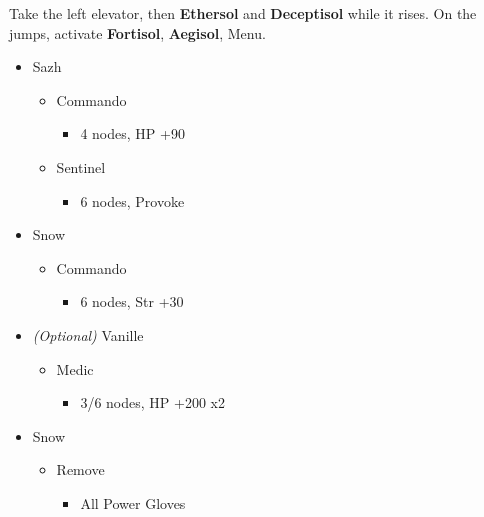\begin{multicols}{2}
	Take the left elevator, then \textbf{Ethersol} and \textbf{Deceptisol} while it rises. On the jumps, activate \textbf{Fortisol}, \textbf{Aegisol}, Menu.
	\begin{menu}
		\begin{itemize}
			\crystarium
			\begin{itemize}
				\item Sazh
				      \begin{itemize}
					      \item Commando
					            \begin{itemize}
						            \item 4 nodes, HP +90
					            \end{itemize}
					      \item Sentinel
					            \begin{itemize}
						            \item 6 nodes, Provoke
					            \end{itemize}
				      \end{itemize}
				\item Snow
				      \begin{itemize}
					      \item Commando
					            \begin{itemize}
						            \item 6 nodes, Str +30
					            \end{itemize}
				      \end{itemize}
				\item \textit{(Optional)} Vanille
				      \begin{itemize}
					      \item Medic
					            \begin{itemize}
						            \item 3/6 nodes, HP +200 x2
					            \end{itemize}
				      \end{itemize}
			\end{itemize}
			\equip
			\begin{itemize}
				\item Snow
				      \begin{itemize}
					      \item Remove
					            \begin{itemize}
						            \item All Power Gloves
					            \end{itemize}

\end{itemize}
\end{itemize}
\end{itemize}
\end{menu}
\end{multicols}
